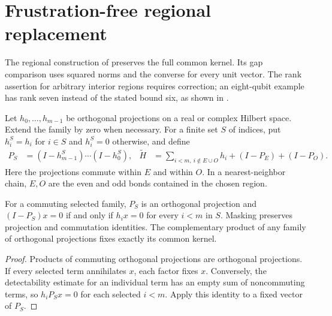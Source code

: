 \section{Frustration-free regional replacement}

The regional construction of \cite[Definition~5.10]{Arad2016RigorousRG}
preserves the full common kernel. Its gap comparison uses squared norms
and the converse for every unit vector. The rank assertion for arbitrary
interior regions requires correction; an eight-qubit example has rank
seven instead of the stated bound six, as shown in
\cite{gap:alvv16_ff_rank}.

\begin{definition}
    \label{def:alvv_ff_regional_replacement}
    \leanok
    Let $h_0,\ldots,h_{m-1}$ be orthogonal projections on a real or
    complex Hilbert space. Extend the family by zero when necessary.
    For a finite set $S$ of indices, put $h_i^S=h_i$ for $i\in S$ and
    $h_i^S=0$ otherwise, and define
    \begin{align}
        P_S          & =(I-h_{m-1}^S)\cdots(I-h_0^S),                    &
        \widetilde H & =\sum_{i<m,\ i\notin E\cup O}h_i+(I-P_E)+(I-P_O).
        \label{eq:alvv_ff_regional_replacement}
    \end{align}
    Here the projections commute within $E$ and within $O$.
    In a nearest-neighbor chain, $E,O$ are the even and odd bonds
    contained in the chosen region.
\end{definition}

\begin{lemma}
    \label{lem:alvv_ff_common_kernel_layers}
    \leanok
    For a commuting selected family, $P_S$ is an orthogonal projection
    and $(I-P_S)x=0$ if and only if $h_ix=0$ for every $i<m$ in $S$.
    Masking preserves projection and commutation identities.
    The complementary product of any family of orthogonal projections
    fixes exactly its common kernel.
\end{lemma}
\begin{proof}\leanok
    Products of commuting orthogonal projections are orthogonal
    projections. If every selected term annihilates $x$, each factor
    fixes $x$. Conversely, the detectability estimate for an individual
    term has an empty sum of noncommuting terms, so $h_iP_Sx=0$ for
    each selected $i<m$. Apply this identity to a fixed vector of $P_S$.
\end{proof}

